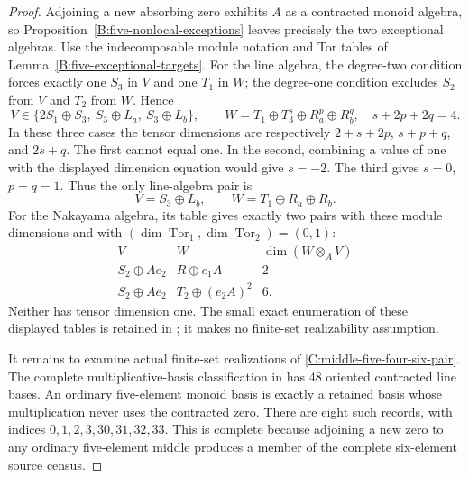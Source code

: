 \begin{proof}
Adjoining a new absorbing zero exhibits $A$ as a contracted monoid
algebra, so Proposition~\ref{B:five-nonlocal-exceptions} leaves precisely
the two exceptional algebras.  Use the indecomposable module notation and
Tor tables of Lemma~\ref{B:five-exceptional-targets}.
For the line algebra, the degree-two condition forces exactly one
$S_3$ in $V$ and one $T_1$ in $W$; the degree-one condition excludes
$S_2$ from $V$ and $T_2$ from $W$.  Hence
\[
 V\in\{2S_1\oplus S_3,\ S_3\oplus L_a,\ S_3\oplus L_b\},
 \qquad W=T_1\oplus T_3^s\oplus R_a^p\oplus R_b^q,
 \quad s+2p+2q=4.
\]
In these three cases the tensor dimensions are respectively
$2+s+2p$, $s+p+q$, and $2s+q$.
The first cannot equal one.  In the second, combining a value of one
with the displayed dimension equation would give $s=-2$.
The third gives $s=0$, $p=q=1$.  Thus the only line-algebra pair is
\begin{equation}\label{C:middle-five-four-six-pair}
 V=S_3\oplus L_b,\qquad W=T_1\oplus R_a\oplus R_b.
\end{equation}
For the Nakayama algebra, its table gives exactly two pairs with these
module dimensions and with $(\dim\operatorname{Tor}_1,
\dim\operatorname{Tor}_2)=(0,1)$:
\[
 \begin{array}{c|c|c}
 V&W&\dim(W\otimes_A V)\\\hline
 S_2\oplus Ae_2&R\oplus e_1A&2\\
 S_2\oplus Ae_2&T_2\oplus(e_2A)^2&6.
 \end{array}
\]
Neither has tensor dimension one.  The small exact enumeration of these
displayed tables is retained in
; it makes no finite-set
realizability assumption.

It remains to examine actual finite-set realizations of
\eqref{C:middle-five-four-six-pair}.  The complete multiplicative-basis
classification in 
has 48 oriented contracted line bases.  An ordinary five-element monoid
basis is exactly a retained basis whose multiplication never uses the
contracted zero.  There are eight such records, with indices
$0,1,2,3,30,31,32,33$.  This is complete because adjoining a new zero to
any ordinary five-element middle produces a member of the complete
six-element source census.


\end{proof}
